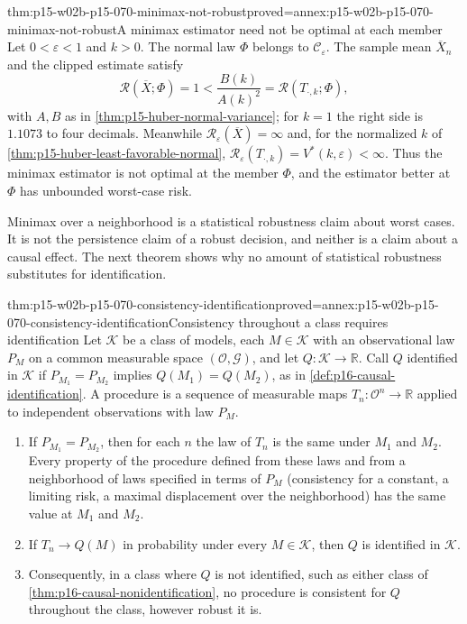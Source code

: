 \begin{hbtheorem}{thm:p15-w02b-p15-070-minimax-not-robust}{proved=annex:p15-w02b-p15-070-minimax-not-robust}{A minimax estimator need not be optimal at each member}
Let \(0<\varepsilon<1\) and \(k>0\). The normal law \(\Phi\) belongs to
\(\mathcal C_\varepsilon\). The sample mean \(\overline X_n\) and the
clipped estimate satisfy
\[
 \mathcal R(\overline X;\Phi)=1<
 \frac{B(k)}{A(k)^2}=\mathcal R(T_{\cdot,k};\Phi),
\]
with \(A,B\) as in \cref{thm:p15-huber-normal-variance}; for \(k=1\)
the right side is \(1.1073\) to four decimals. Meanwhile
\(\mathcal R_\varepsilon(\overline X)=\infty\) and, for the normalized
\(k\) of \cref{thm:p15-huber-least-favorable-normal},
\(\mathcal R_\varepsilon(T_{\cdot,k})=V^*(k,\varepsilon)<\infty\).
Thus the minimax estimator is not optimal at the member \(\Phi\), and the
estimator better at \(\Phi\) has unbounded worst-case risk.
\end{hbtheorem}

Minimax over a neighborhood is a statistical robustness claim about worst
cases. It is not the persistence claim of a robust decision, and neither
is a claim about a causal effect. The next theorem shows why no amount of
statistical robustness substitutes for identification.

\begin{hbtheorem}{thm:p15-w02b-p15-070-consistency-identification}{proved=annex:p15-w02b-p15-070-consistency-identification}{Consistency throughout a class requires identification}
Let \(\mathcal K\) be a class of models, each \(M\in\mathcal K\) with an
observational law \(P_M\) on a common measurable space
\((\mathcal O,\mathcal G)\), and let \(Q:\mathcal K\to\mathbb R\).
Call \(Q\) identified in \(\mathcal K\) if \(P_{M_1}=P_{M_2}\) implies
\(Q(M_1)=Q(M_2)\), as in \cref{def:p16-causal-identification}.
A procedure is a sequence of measurable maps
\(T_n:\mathcal O^n\to\mathbb R\) applied to independent observations
with law \(P_M\).
\begin{enumerate}
\item If \(P_{M_1}=P_{M_2}\), then for each \(n\) the law of \(T_n\) is
      the same under \(M_1\) and \(M_2\). Every property of the procedure
      defined from these laws and from a neighborhood of laws specified
      in terms of \(P_M\) (consistency for a constant, a limiting risk, a
      maximal displacement over the neighborhood) has the same value at
      \(M_1\) and \(M_2\).
\item If \(T_n\to Q(M)\) in probability under every \(M\in\mathcal K\),
      then \(Q\) is identified in \(\mathcal K\).
\item Consequently, in a class where \(Q\) is not identified, such as
      either class of \cref{thm:p16-causal-nonidentification}, no
      procedure is consistent for \(Q\) throughout the class, however
      robust it is.
\end{enumerate}
\end{hbtheorem}

